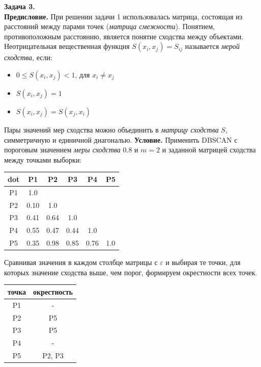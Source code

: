 \textbf{Задача 3.}\\
\textbf{Предисловие.}
При решении задачи 1 использовалась матрица, состоящая из расстояний между парами точек (\textit{матрица смежности}). Понятием, противоположным расстоянию, является понятие сходства между объектами. Неотрицательная вещественная функция $S(x_i,x_j) = S_{ij}$ называется \textit{мерой сходства}, если:
\begin{itemize}
    \item $0 \leq S(x_i,x_j) < 1$, для $x_i \neq x_j$
    \item $S(x_i,x_j)=1$
    \item $S(x_i,x_j)=S(x_j,x_i)$
\end{itemize}
Пары значений мер сходства можно объединить в \textit{матрицу сходства} $S$, симметричную и единичной диагональю.
\textbf{Условие.}
Применить DBSCAN с пороговым значением \textit{меры сходства} 0.8 и $m = 2$ и заданной матрицей сходства между точками выборки:

\begin{center}
\begin{tabular}{ |c|c|c|c|c|c|} 
 \hline
dot & P1 & P2 & P3 & P4 & P5  \\ \hline
P1 & 1.0 &  &  &  &     \\ \hline
P2 & 0.10 & 1.0 &  &  &  \\ \hline
P3 & 0.41 & 0.64& 1.0 &  & \\ \hline
P4 & 0.55 & 0.47 & 0.44 & 1.0 & \\ \hline
P5 & 0.35 & 0.98 & 0.85 & 0.76 & 1.0 \\ \hline
\end{tabular}
\end{center}

Сравнивая значения в каждом столбце матрицы с $\varepsilon$ и выбирая те точки, для которых значение сходства выше, чем порог, формируем окрестности всех точек.

\begin{center}
\begin{tabular}{ |c|c| } 
 \hline
 точка & окрестность \\\hline
 P1 & -\\ 
 P2 & P5\\ 
 P3 & P5\\ 
 P4 & -\\
 P5 & P2, P3\\
 \hline
\end{tabular}
\end{center}

